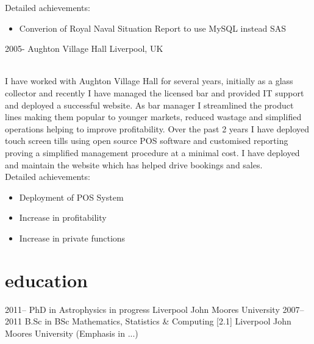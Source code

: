 \documentclass[]{cv-style}          %
\begin{document}
\begin{entrylist}
{  Detailed achievements:
  \begin{itemize}
    \item Converion of Royal Naval Situation Report to use MySQL instead SAS
  \end{itemize}}
\entry
  {2005-}
  {Aughton Village Hall}
  {Liverpool, UK}
  {\\{I have worked with Aughton Village Hall for several years, initially as a glass collector and recently I have managed the licensed bar and provided IT support and deployed a successful website. As bar manager I streamlined the product lines making them popular to younger markets, reduced wastage and simplified operations helping to improve profitability. Over the past 2 years I have deployed touch screen tills using open source POS software and customised reporting proving a simplified management procedure at a minimal cost. I have deployed and maintain the website which has helped drive bookings and sales.\\}
    Detailed achievements:
  \begin{itemize}
    \item Deployment of POS System
    \item Increase in profitability
    \item Increase in private functions 
  \end{itemize}}

\end{entrylist}


\section{education}

\begin{entrylist}
\entry
{2011--}
{PhD {\normalfont in Astrophysics in progress}}
{Liverpool John Moores University}
{\vspace{-0.3cm}}
\entry
{2007--2011}
{B.Sc {\normalfont in BSc Mathematics, Statistics \& Computing [2.1]}}
{Liverpool John Moores University}
{(Emphasis in ...)}
\end{entrylist}
\end{document}
